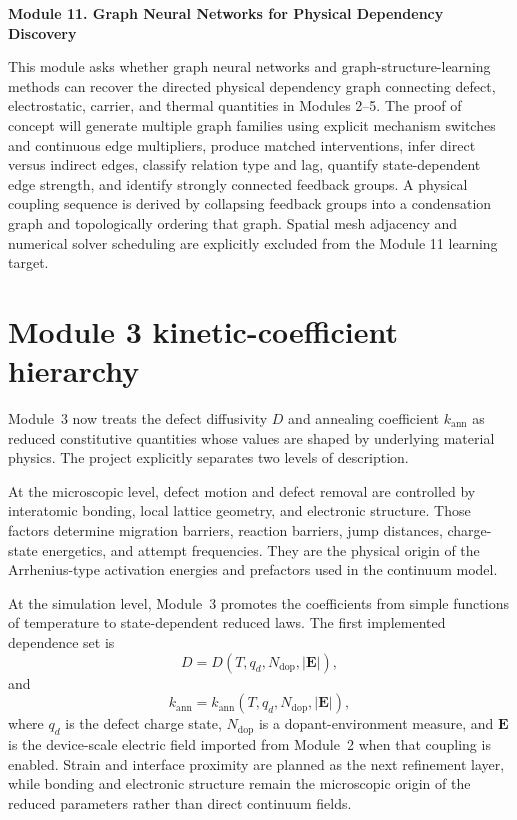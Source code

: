\documentclass[11pt]{article}
\begin{document}
\textbf{Module 11. Graph Neural Networks for Physical Dependency Discovery}

This module asks whether graph neural networks and graph-structure-learning methods can recover the directed physical dependency graph connecting defect, electrostatic, carrier, and thermal quantities in Modules 2--5. The proof of concept will generate multiple graph families using explicit mechanism switches and continuous edge multipliers, produce matched interventions, infer direct versus indirect edges, classify relation type and lag, quantify state-dependent edge strength, and identify strongly connected feedback groups. A physical coupling sequence is derived by collapsing feedback groups into a condensation graph and topologically ordering that graph. Spatial mesh adjacency and numerical solver scheduling are explicitly excluded from the Module 11 learning target.


\section{Module 3 kinetic-coefficient hierarchy}
Module~3 now treats the defect diffusivity $D$ and annealing coefficient $k_{\mathrm{ann}}$ as reduced constitutive quantities whose values are shaped by underlying material physics. The project explicitly separates two levels of description.

At the microscopic level, defect motion and defect removal are controlled by interatomic bonding, local lattice geometry, and electronic structure. Those factors determine migration barriers, reaction barriers, jump distances, charge-state energetics, and attempt frequencies. They are the physical origin of the Arrhenius-type activation energies and prefactors used in the continuum model.

At the simulation level, Module~3 promotes the coefficients from simple functions of temperature to state-dependent reduced laws. The first implemented dependence set is
\begin{equation}
D = D\left(T, q_d, N_{\mathrm{dop}}, |\mathbf{E}|\right),
\end{equation}
and
\begin{equation}
k_{\mathrm{ann}} = k_{\mathrm{ann}}\left(T, q_d, N_{\mathrm{dop}}, |\mathbf{E}|\right),
\end{equation}
where $q_d$ is the defect charge state, $N_{\mathrm{dop}}$ is a dopant-environment measure, and $\mathbf{E}$ is the device-scale electric field imported from Module~2 when that coupling is enabled. Strain and interface proximity are planned as the next refinement layer, while bonding and electronic structure remain the microscopic origin of the reduced parameters rather than direct continuum fields.
\end{document}
